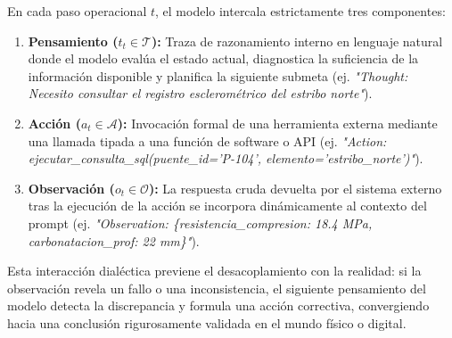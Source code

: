 En cada paso operacional $t$, el modelo intercala estrictamente tres componentes:

\begin{enumerate}
    \item \textbf{Pensamiento ($t_t \in \mathcal{T}$):} Traza de razonamiento interno en lenguaje natural donde el modelo evalúa el estado actual, diagnostica la suficiencia de la información disponible y planifica la siguiente submeta (ej. \textit{"Thought: Necesito consultar el registro esclerométrico del estribo norte"}).
    \item \textbf{Acción ($a_t \in \mathcal{A}$):} Invocación formal de una herramienta externa mediante una llamada tipada a una función de software o API (ej. \textit{"Action: ejecutar\_consulta\_sql(puente\_id='P-104', elemento='estribo\_norte')"}).
    \item \textbf{Observación ($o_t \in \mathcal{O}$):} La respuesta cruda devuelta por el sistema externo tras la ejecución de la acción se incorpora dinámicamente al contexto del prompt (ej. \textit{"Observation: \{resistencia\_compresion: 18.4 MPa, carbonatacion\_prof: 22 mm\}"}).
\end{enumerate}

Esta interacción dialéctica previene el desacoplamiento con la realidad: si la observación revela un fallo o una inconsistencia, el siguiente pensamiento del modelo detecta la discrepancia y formula una acción correctiva, convergiendo hacia una conclusión rigurosamente validada en el mundo físico o digital.

